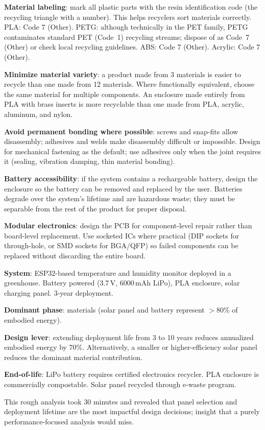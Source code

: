 \textbf{Material labeling}: mark all plastic parts with the resin identification code (the recycling triangle with a number). This helps recyclers sort materials correctly. PLA: Code 7 (Other). PETG: although technically in the PET family, PETG contaminates standard PET (Code~1) recycling streams; dispose of as Code~7 (Other) or check local recycling guidelines. ABS: Code 7 (Other). Acrylic: Code 7 (Other).

\textbf{Minimize material variety}: a product made from 3 materials is easier to recycle than one made from 12 materials. Where functionally equivalent, choose the same material for multiple components. An enclosure made entirely from PLA with brass inserts is more recyclable than one made from PLA, acrylic, aluminum, and nylon.

\textbf{Avoid permanent bonding where possible}: screws and snap-fits allow disassembly; adhesives and welds make disassembly difficult or impossible. Design for mechanical fastening as the default; use adhesives only when the joint requires it (sealing, vibration damping, thin material bonding).

\textbf{Battery accessibility}: if the system contains a rechargeable battery, design the enclosure so the battery can be removed and replaced by the user. Batteries degrade over the system's lifetime and are hazardous waste; they must be separable from the rest of the product for proper disposal.

\textbf{Modular electronics}: design the PCB for component-level repair rather than board-level replacement. Use socketed ICs where practical (DIP sockets for through-hole, or SMD sockets for BGA/QFP) so failed components can be replaced without discarding the entire board.



\begin{examplebox}
\textbf{System}: ESP32-based temperature and humidity monitor deployed in a greenhouse. Battery powered (3.7\,V, 6000\,mAh LiPo), PLA enclosure, solar charging panel. 3-year deployment.

\textbf{Dominant phase}: materials (solar panel and battery represent $>$80\% of embodied energy).

\textbf{Design lever}: extending deployment life from 3 to 10 years reduces annualized embodied energy by 70\%. Alternatively, a smaller or higher-efficiency solar panel reduces the dominant material contribution.

\textbf{End-of-life}: LiPo battery requires certified electronics recycler. PLA enclosure is commercially compostable. Solar panel recycled through e-waste program.

This rough analysis took 30 minutes and revealed that panel selection and deployment lifetime are the most impactful design decisions; insight that a purely performance-focused analysis would miss.
\end{examplebox}


